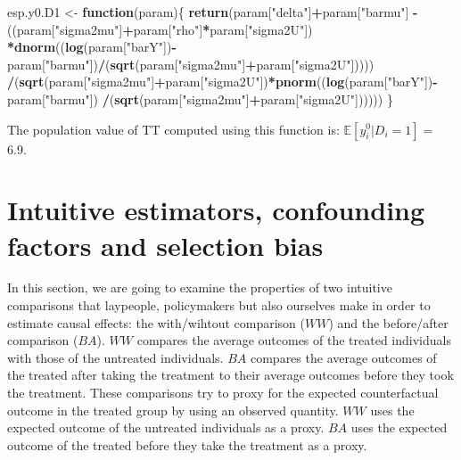 \documentclass[]{book}
\newenvironment{Shaded}{\begin{snugshade}}{\end{snugshade}}
\newcommand{\KeywordTok}[1]{\textcolor[rgb]{0.13,0.29,0.53}{\textbf{#1}}}
\newcommand{\StringTok}[1]{\textcolor[rgb]{0.31,0.60,0.02}{#1}}
\newcommand{\ControlFlowTok}[1]{\textcolor[rgb]{0.13,0.29,0.53}{\textbf{#1}}}
\newcommand{\OperatorTok}[1]{\textcolor[rgb]{0.81,0.36,0.00}{\textbf{#1}}}
\newcommand{\NormalTok}[1]{#1}
\newcommand{\esp}[1]{\mathbb{E}[ #1 ]}
\theoremstyle{definition}
\theoremstyle{definition}
\theoremstyle{definition}
\theoremstyle{remark}
\begin{document}
\begin{Shaded}
\begin{Highlighting}[]
\NormalTok{esp.y0.D1 <-}\StringTok{ }\ControlFlowTok{function}\NormalTok{(param)\{}
  \KeywordTok{return}\NormalTok{(param[}\StringTok{"delta"}\NormalTok{]}\OperatorTok{+}\NormalTok{param[}\StringTok{"barmu"}\NormalTok{]}
         \OperatorTok{-}\NormalTok{((param[}\StringTok{"sigma2mu"}\NormalTok{]}\OperatorTok{+}\NormalTok{param[}\StringTok{"rho"}\NormalTok{]}\OperatorTok{*}\NormalTok{param[}\StringTok{"sigma2U"}\NormalTok{])}
           \OperatorTok{*}\KeywordTok{dnorm}\NormalTok{((}\KeywordTok{log}\NormalTok{(param[}\StringTok{"barY"}\NormalTok{])}\OperatorTok{-}\NormalTok{param[}\StringTok{"barmu"}\NormalTok{])}\OperatorTok{/}\NormalTok{(}\KeywordTok{sqrt}\NormalTok{(param[}\StringTok{"sigma2mu"}\NormalTok{]}\OperatorTok{+}\NormalTok{param[}\StringTok{"sigma2U"}\NormalTok{]))))}
         \OperatorTok{/}\NormalTok{(}\KeywordTok{sqrt}\NormalTok{(param[}\StringTok{"sigma2mu"}\NormalTok{]}\OperatorTok{+}\NormalTok{param[}\StringTok{"sigma2U"}\NormalTok{])}\OperatorTok{*}\KeywordTok{pnorm}\NormalTok{((}\KeywordTok{log}\NormalTok{(param[}\StringTok{"barY"}\NormalTok{])}\OperatorTok{-}\NormalTok{param[}\StringTok{"barmu"}\NormalTok{])}
                                                          \OperatorTok{/}\NormalTok{(}\KeywordTok{sqrt}\NormalTok{(param[}\StringTok{"sigma2mu"}\NormalTok{]}\OperatorTok{+}\NormalTok{param[}\StringTok{"sigma2U"}\NormalTok{])))))}
\NormalTok{\}}
\end{Highlighting}
\end{Shaded}

The population value of TT computed using this function is:
\(\esp{y_i^0|D_i=1}=\) 6.9.

\section{Intuitive estimators, confounding factors and selection
bias}\label{intuitive-estimators-confounding-factors-and-selection-bias}

In this section, we are going to examine the properties of two intuitive
comparisons that laypeople, policymakers but also ourselves make in
order to estimate causal effects: the with/wihtout comparison (\(WW\))
and the before/after comparison (\(BA\)). \(WW\) compares the average
outcomes of the treated individuals with those of the untreated
individuals. \(BA\) compares the average outcomes of the treated after
taking the treatment to their average outcomes before they took the
treatment. These comparisons try to proxy for the expected
counterfactual outcome in the treated group by using an observed
quantity. \(WW\) uses the expected outcome of the untreated individuals
as a proxy. \(BA\) uses the expected outcome of the treated before they
take the treatment as a proxy.
\end{document}
